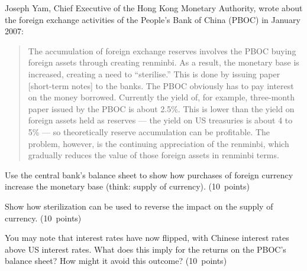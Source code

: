 \documentclass[letterpaper,12pt]{exam}
\begin{document}
\begin{questions}
Joseph Yam, Chief Executive of the Hong Kong Monetary Authority, wrote about the foreign exchange activities of the People's Bank of China (PBOC) in January 2007:
%
\begin{quote}
The accumulation of foreign exchange reserves
involves the PBOC buying foreign assets through creating renminbi.
As a result, the monetary base is increased, creating a need to ``sterilise.''
This is done by issuing paper [short-term notes] to the banks.
The PBOC obviously has to pay interest on the money borrowed.
Currently the yield of, for example, three-month paper issued by the PBOC is about 2.5\%.
This is lower than the yield on foreign assets held as reserves ---
the yield on US treasuries is about 4 to 5\% --- so theoretically
reserve accumulation can be profitable.
The problem, however, is the continuing appreciation of the renminbi,
which gradually reduces the value of those foreign assets in renminbi terms.
\end{quote}

\begin{parts}
\item Use the central bank's balance sheet to show how purchases of
foreign currency increase the monetary base (think:  supply of currency).
(10~points)

\item Show how sterilization can be used to reverse the impact on
the supply of currency.
(10~points)

\item You may note that interest rates have now flipped, with Chinese interest rates above US interest rates.
    What does this imply for the returns on the PBOC's balance sheet?
    How might it avoid this outcome?
(10~points)
\end{parts}


\end{questions}
\end{document}
